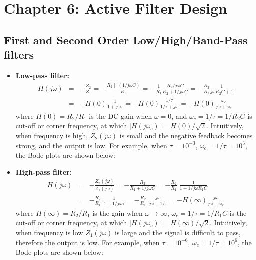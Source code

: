 \documentclass{article}
\begin{document}
\section*{Chapter 6: Active Filter Design}

\subsection{First and Second Order Low/High/Band-Pass filters}


\begin{itemize}
\item {\bf Low-pass filter:}
  \begin{eqnarray}
    H(j\omega)&=&-\frac{Z_2}{Z_1}=-\frac{R_2\;||\;(1/j\omega C)}{R_1}
    =-\frac{1}{R_1}\frac{R_2/j\omega C}{R_2+1/j\omega C}
    =-\frac{R_2}{R_1}\frac{1}{j\omega R_2C+1}
    \nonumber \\
    &=&-H(0)\frac{1}{1+j\omega \tau}=-H(0)\frac{1/\tau}{1/\tau+j\omega} 
    =-H(0)\frac{\omega_c}{j\omega+\omega_c} 
  \end{eqnarray}
  where $H(0)=R_2/R_1$ is the DC gain when $\omega=0$, and
  $\omega_c=1/\tau=1/R_2C$ is cut-off or corner frequency, at which 
  $|H(j\omega_c)|=H(0)/\sqrt{2}$. Intuitively, when frequency is high, 
  $Z_2(j\omega)$ is small and the negative feedback becomes strong,
  and the output is low. For example, when
  $\tau=10^{-3}$, $\omega_c=1/\tau=10^3$, the Bode plots are shown  
  below:


\item {\bf High-pass filter:}
  \begin{eqnarray}
    H(j\omega)&=&-\frac{Z_2(j\omega)}{Z_1(j\omega)}
    =-\frac{R_2}{R_1+1/j\omega C}
    =-\frac{R_2}{R_1}\;\frac{1}{1+1/j\omega R_1C}
    \nonumber \\
    &=&-\frac{R_2}{R_1}\;\frac{1}{1+1/j\omega\tau}
    =-\frac{R_2}{R_1}\;\frac{j\omega}{j\omega +1/\tau}
    =-H(\infty)\frac{j\omega}{j\omega+\omega_c} 
  \end{eqnarray}
  where $H(\infty)=R_2/R_1$ is the gain when $\omega\rightarrow\infty$, 
  $\omega_c=1/\tau=1/R_1C$ is the cut-off or corner frequency, at which
  $|H(j\omega_c)|=H(\infty)/\sqrt{2}$. Intuitively, when frequency is 
  low $Z_1(j\omega)$ is large and the signal is difficult to pass, 
  therefore the output is low. For example, when $\tau=10^{-6}$, 
  $\omega_c=1/\tau=10^6$, the Bode plots are shown below:
  

\end{itemize}
\end{document}
